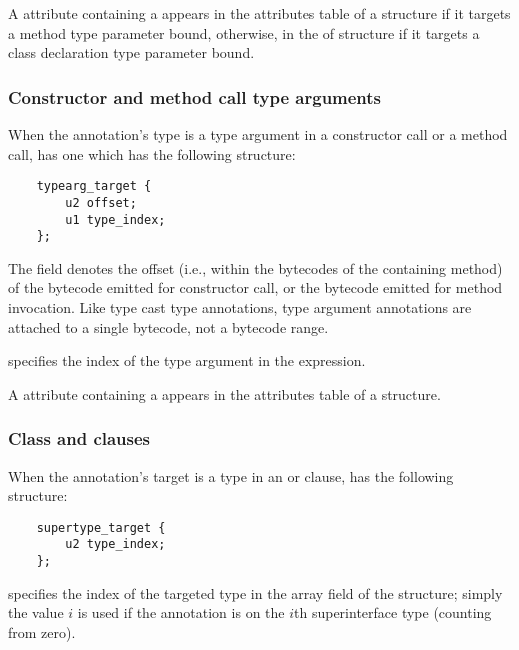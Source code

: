 \documentclass[10pt]{article}
\begin{document}
A \RuntimeInOrVisibleTypeAnnotations attribute containing a
 appears in the attributes table of a
 structure if it targets a method type parameter bound,
otherwise, in the  of  structure if it
targets a class declaration type parameter bound.

\subsubsection{Constructor and method call type arguments\label{class-file:ext:ri:con-typearg}}

When the annotation's type is a type argument in a constructor call or
a method call,  has one 
which has the following structure:

\begin{Verbatim}
    typearg_target {
        u2 offset;
        u1 type_index;
    };
\end{Verbatim}

The  field denotes the offset (i.e., within the bytecodes
of the containing method) of the  bytecode emitted for
constructor call, or the
 bytecode emitted for
method invocation.  Like type cast type annotations, type argument
annotations are attached to a single bytecode, not a bytecode range.

 specifies the index of the type argument in the
expression.

A \RuntimeInOrVisibleTypeAnnotations attribute containing a
 appears in the attributes table of a
 structure.


\subsubsection{Class  and  clauses\label{class-file:ext:ri:extends}}

When the annotation's target is a type in an  or
 clause,  has the following
structure:

\begin{Verbatim}
    supertype_target {
        u2 type_index;
    };
\end{Verbatim}

 specifies the index of the targeted type in the
 array field of the  structure;
simply the value $i$ is used if the annotation is on the $i$th
superinterface type (counting from zero).
\end{document}
